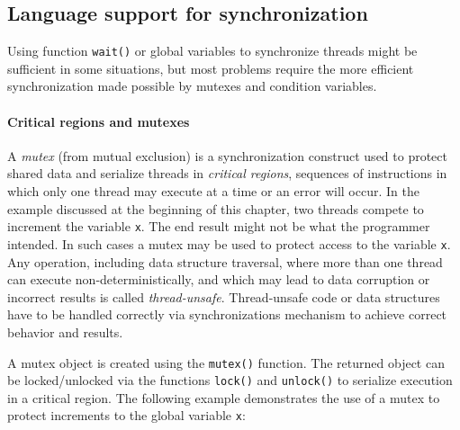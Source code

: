 \subsection{Language support for synchronization}

Using function \texttt{wait()} or global variables to synchronize threads might
be sufficient in some situations, but most problems require the more efficient
synchronization made possible by mutexes and condition variables.

\paragraph{Critical regions and mutexes}

A \emph{mutex} (from mutual exclusion) is a synchronization construct
used to protect shared data and serialize threads in \emph{critical
regions}, sequences of instructions in which only one thread may
execute at a time or an error will occur. In the example discussed at
the beginning of this chapter, two threads compete to increment the
variable \texttt{x}. The end result might not be what the programmer
intended. In such cases a mutex may be used to protect access to the
variable \texttt{x}. Any operation, including data structure
traversal, where more than one thread can execute
non-deterministically, and which may lead to data corruption or
incorrect results is called \emph{thread-unsafe}. Thread-unsafe code
or data structures have to be handled correctly via synchronizations
mechanism to achieve correct behavior and results.

A mutex object is created using the \texttt{mutex()} function. The returned
object can be locked/unlocked via the functions \texttt{lock()} and
\texttt{unlock()} to serialize execution in a critical region. The following
example demonstrates the use of a mutex to protect increments to the global
variable \texttt{x}:


